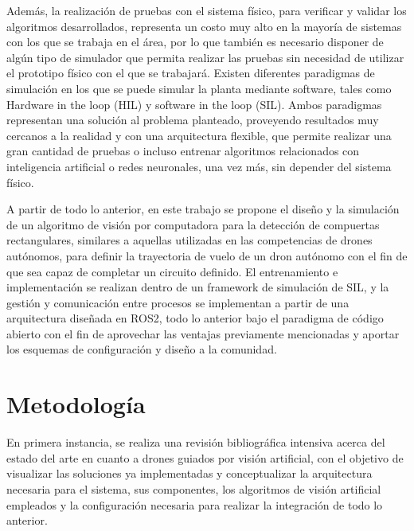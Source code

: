 Además, la realización de pruebas con el sistema físico, para verificar y validar los algoritmos desarrollados, representa un costo muy alto en la mayoría de sistemas con los que se trabaja en el área, por lo que también es necesario disponer de algún tipo de simulador que permita realizar las pruebas sin necesidad de utilizar el prototipo físico con el que se trabajará. Existen diferentes paradigmas de simulación en los que se puede simular la planta mediante software, tales como Hardware in the loop (HIL) y software in the loop (SIL). Ambos paradigmas representan una solución al problema planteado, proveyendo resultados muy cercanos a la realidad y con una arquitectura flexible, que permite realizar una gran cantidad de pruebas o incluso entrenar algoritmos relacionados con inteligencia artificial o redes neuronales, una vez más, sin depender del sistema físico. 

A partir de todo lo anterior, en este trabajo se propone el diseño y la simulación de un algoritmo de visión por computadora para la detección de compuertas rectangulares, similares a aquellas utilizadas en las competencias de drones autónomos, para definir la trayectoria de vuelo de un dron autónomo con el fin de que sea capaz de completar un circuito definido.  El entrenamiento e implementación se realizan dentro de un framework de simulación de SIL, y la gestión y comunicación entre procesos se implementan a partir de una arquitectura diseñada en ROS2, todo lo anterior bajo el paradigma de código abierto con el fin de aprovechar las ventajas previamente mencionadas y aportar los esquemas de configuración y diseño a la comunidad.

\vfill







\section{Metodología}

En primera instancia, se realiza una revisión bibliográfica intensiva acerca del estado del arte en cuanto a drones guiados por visión artificial, con el objetivo de visualizar las soluciones ya implementadas y conceptualizar la arquitectura necesaria para el sistema, sus componentes, los algoritmos de visión artificial empleados y la configuración necesaria para realizar la integración de todo lo anterior.


